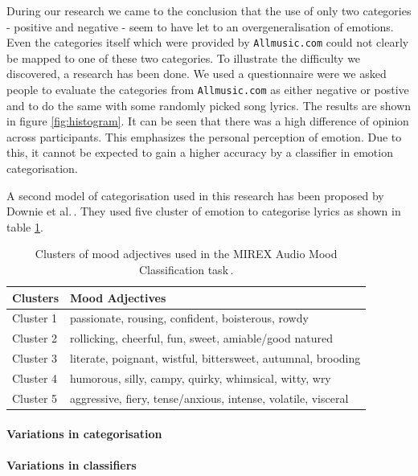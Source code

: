 \documentclass[a4paper,12pt]{article}
\begin{document}
During our research we came to the conclusion that the use of only two categories - positive and negative - seem to have let to an overgeneralisation of emotions. Even the categories itself which were provided by \texttt{Allmusic.com} could not clearly be mapped to one of these two categories. To illustrate the difficulty we discovered, a research has been done. We used a questionnaire were we asked people to evaluate the categories from \texttt{Allmusic.com} as either negative or postive and to do the same with some randomly picked song lyrics. The results are shown in figure \ref{fig:histogram}. It can be seen that there was a high difference of opinion across participants. This emphasizes the personal perception of emotion. Due to this, it cannot be expected to gain a higher accuracy by a classifier in emotion categorisation.

A second model of categorisation used in this research has been proposed by Downie et al.\,\cite{downie20082007}. They used five cluster of emotion to categorise lyrics as shown in table \ref{tab:moodClusters}.

\begin{table}
\begin{center}
\begin{tabular}{| l | l |}
\hline
\textbf{Clusters} & \textbf{Mood Adjectives} \\ \hline \hline 
Cluster 1 & passionate, rousing, confident, boisterous, rowdy \\ \hline
Cluster 2 & rollicking, cheerful, fun, sweet, amiable/good natured \\ \hline
Cluster 3 & literate, poignant, wistful, bittersweet, autumnal, brooding \\ \hline
Cluster 4 & humorous, silly, campy, quirky, whimsical, witty, wry \\ \hline
Cluster 5 & aggressive, fiery, tense/anxious, intense, volatile, visceral \\ \hline
\end{tabular}
\caption{Clusters of mood adjectives used in the MIREX Audio Mood Classification task\,\cite{downie20082007}.}
\label{tab:moodClusters}
\end{center}
\end{table}

\paragraph{Variations in categorisation}

\paragraph{Variations in classifiers}
\end{document}
